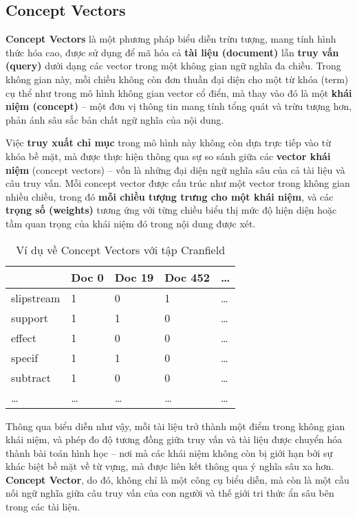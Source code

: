 \subsection{Concept Vectors}
\textbf{Concept Vectors} \cite{Abdulahhad_2018} là một phương pháp biểu diễn trừu tượng, mang tính hình thức hóa cao, được sử dụng để mã hóa cả \textbf{tài liệu (document)} lẫn \textbf{truy vấn (query)} dưới dạng các vector trong một không gian ngữ nghĩa đa chiều. Trong không gian này, mỗi chiều không còn đơn thuần đại diện cho một từ khóa (term) cụ thể như trong mô hình không gian vector cổ điển, mà thay vào đó là một \textbf{khái niệm (concept)} -- một đơn vị thông tin mang tính tổng quát và trừu tượng hơn, phản ánh sâu sắc bản chất ngữ nghĩa của nội dung.

Việc \textbf{truy xuất chỉ mục} trong mô hình này không còn dựa trực tiếp vào từ khóa bề mặt, mà được thực hiện thông qua sự so sánh giữa các \textbf{vector khái niệm} (concept vectors) -- vốn là những đại diện ngữ nghĩa sâu của cả tài liệu và câu truy vấn. Mỗi concept vector được cấu trúc như một vector trong không gian nhiều chiều, trong đó \textbf{mỗi chiều tượng trưng cho một khái niệm}, và các \textbf{trọng số (weights)} tương ứng với từng chiều biểu thị mức độ hiện diện hoặc tầm quan trọng của khái niệm đó trong nội dung được xét.

\begin{table}[H]
    \centering
    \caption{Ví dụ về Concept Vectors với tập Cranfield}
    \begin{tabularx}{\linewidth}{l || X X X X}
        \toprule
                   & Doc 0 & Doc 19 & Doc 452 & \dots \\
        \midrule\midrule
        slipstream & 1     & 0      & 1       & \dots \\
        support    & 1     & 1      & 0       & \dots \\
        effect     & 1     & 0      & 0       & \dots \\
        specif     & 1     & 1      & 0       & \dots \\
        subtract   & 1     & 0      & 0       & \dots \\
        \dots      & \dots & \dots  & \dots   & \dots \\
        \bottomrule
    \end{tabularx}
\end{table}

Thông qua biểu diễn như vậy, mỗi tài liệu trở thành một điểm trong không gian khái niệm, và phép đo độ tương đồng giữa truy vấn và tài liệu được chuyển hóa thành bài toán hình học -- nơi mà các khái niệm không còn bị giới hạn bởi sự khác biệt bề mặt về từ vựng, mà được liên kết thông qua ý nghĩa sâu xa hơn. \textbf{Concept Vector}, do đó, không chỉ là một công cụ biểu diễn, mà còn là một cầu nối ngữ nghĩa giữa câu truy vấn của con người và thế giới tri thức ẩn sâu bên trong các tài liệu.
